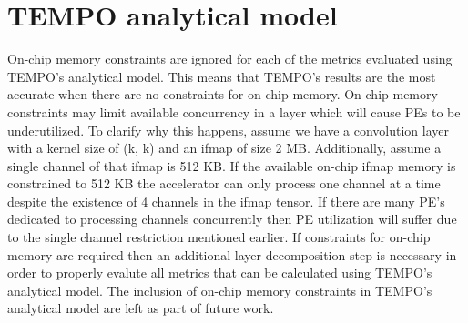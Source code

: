 \section{TEMPO analytical model}
\label{chap:dataflow_dse:exploring:tempo_model}

On-chip memory constraints are ignored for each of the metrics evaluated using
TEMPO's analytical model. This means that TEMPO's results are the most accurate
when there are no constraints for on-chip memory. On-chip memory constraints may
limit available concurrency in a layer which will cause PEs to be underutilized.
To clarify why this happens, assume we have a convolution layer with a kernel
size of (k, k) and an ifmap of size 2 MB. Additionally, assume a single channel
of that ifmap is 512 KB. If the available on-chip ifmap memory is constrained to
512 KB the accelerator can only process one channel at a time despite the
existence of 4 channels in the ifmap tensor. If there are many PE's dedicated to
processing channels concurrently then PE utilization will suffer due to the
single channel restriction mentioned earlier. If constraints for on-chip memory
are required then an additional layer decomposition step is necessary in order
to properly evalute all metrics that can be calculated using TEMPO's analytical
model. The inclusion of on-chip memory constraints in TEMPO's analytical model
are left as part of future work.  





